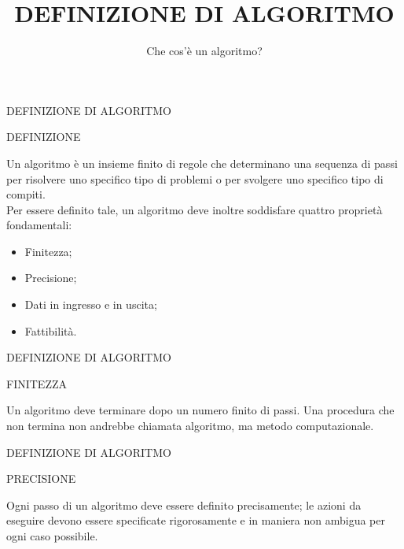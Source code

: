 \documentclass[aspectratio=1610]{beamer}
\title{DEFINIZIONE DI ALGORITMO}
\subtitle{Che cos'è un algoritmo?}
\date{}
\institute{\textit{
        Fonti:
        \begin{itemize}
            \item[-] \href{https://it.wikipedia.org/wiki/The_Art_of_Computer_Programming}{The Art of Computer Programming - Donald E. Knuth}
        \end{itemize}
    }
}
\begin{document}
\begin{frame}
    \titlepage
\end{frame}

\begin{frame}{DEFINIZIONE DI ALGORITMO}
    \begin{alertblock}{DEFINIZIONE}
        \begin{minipage}{0.98\linewidth}
            \justifying
            Un algoritmo è un insieme finito di regole che determinano una 
            sequenza di passi per risolvere uno specifico tipo di problemi o per 
            svolgere uno specifico tipo di compiti.\\
            \bigskip
            \pause
            Per essere definito tale, un algoritmo deve inoltre soddisfare quattro 
            proprietà fondamentali:
            \begin{itemize}
                \item Finitezza;
                \item Precisione;
                \item Dati in ingresso e in uscita;
                \item Fattibilità.
            \end{itemize}
            \bigskip
        \end{minipage}
    \end{alertblock}
\end{frame}

\begin{frame}{DEFINIZIONE DI ALGORITMO}
    \begin{alertblock}{FINITEZZA}
        \begin{minipage}{0.98\linewidth}
            \justifying
            Un algoritmo deve terminare dopo un numero finito di passi. Una procedura 
            che non termina non andrebbe chiamata algoritmo, ma metodo computazionale. 
            \bigskip
        \end{minipage}
    \end{alertblock}
\end{frame}

\begin{frame}{DEFINIZIONE DI ALGORITMO}
    \begin{alertblock}{PRECISIONE}
        \begin{minipage}{0.98\linewidth}
            \justifying
            Ogni passo di un algoritmo deve essere definito precisamente; le azioni da 
            eseguire devono essere specificate rigorosamente e in maniera non ambigua 
            per ogni caso possibile.
            \bigskip
        \end{minipage}
    \end{alertblock}
\end{frame}
\end{document}
